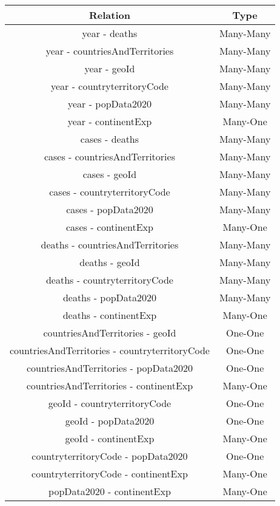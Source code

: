 \documentclass[]{article}
\begin{document}
\quad
\begin{tabular}{ |c|c| }
    \hline
    \textbf{Relation} & \textbf{Type} \\  
    \hline
    year - deaths & Many-Many\\
    year - countriesAndTerritories & Many-Many\\
    year - geoId & Many-Many\\
    year - countryterritoryCode & Many-Many\\
    year - popData2020 & Many-Many\\
    year - continentExp & Many-One\\
    cases - deaths & Many-Many\\
    cases - countriesAndTerritories & Many-Many\\
    cases - geoId & Many-Many\\
    cases - countryterritoryCode & Many-Many\\
    cases - popData2020 & Many-Many\\
    cases - continentExp & Many-One\\  
    deaths - countriesAndTerritories & Many-Many\\
    deaths - geoId & Many-Many\\
    deaths - countryterritoryCode & Many-Many\\
    deaths - popData2020 & Many-Many\\
    deaths - continentExp & Many-One\\  
    countriesAndTerritories - geoId & One-One\\
    countriesAndTerritories - countryterritoryCode & One-One\\
    countriesAndTerritories - popData2020 & One-One\\
    countriesAndTerritories - continentExp & Many-One\\  
    geoId - countryterritoryCode & One-One\\
    geoId - popData2020 & One-One\\
    geoId - continentExp & Many-One\\  
    countryterritoryCode - popData2020 & One-One\\
    countryterritoryCode - continentExp & Many-One\\ 
    popData2020 - continentExp & Many-One\\
    \hline  
\end{tabular}    

\newpage
\end{document}
